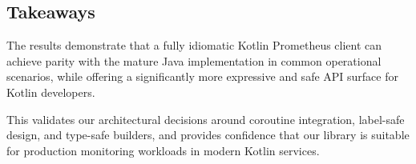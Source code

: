 \subsection*{Takeaways}

The results demonstrate that a fully idiomatic Kotlin Prometheus client can achieve parity with the mature Java implementation in common operational scenarios, while offering a significantly more expressive and safe API surface for Kotlin developers.

This validates our architectural decisions around coroutine integration, label-safe design, and type-safe builders, and provides confidence that our library is suitable for production monitoring workloads in modern Kotlin services.
